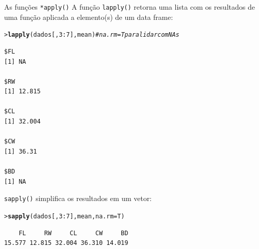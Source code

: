 \documentclass[10pt]{beamer}\usepackage[]{graphicx}\usepackage[]{color}
\makeatletter
\newcommand{\hlnum}[1]{\textcolor[rgb]{0.686,0.059,0.569}{#1}}%
\newcommand{\hlcom}[1]{\textcolor[rgb]{0.498,0.498,0.498}{\textit{#1}}}%
\newcommand{\hlopt}[1]{\textcolor[rgb]{0,0,0}{#1}}%
\newcommand{\hlstd}[1]{\textcolor[rgb]{0.345,0.345,0.345}{#1}}%
\newcommand{\hlkwc}[1]{\textcolor[rgb]{0.333,0.667,0.333}{#1}}%
\newcommand{\hlkwd}[1]{\textcolor[rgb]{0.282,0.239,0.545}{\textbf{#1}}}%
\newenvironment{kframe}{%
 \def\at@end@of@kframe{}%
 \ifinner\ifhmode%
  \def\at@end@of@kframe{\end{minipage}}%
  \begin{minipage}{\columnwidth}%
 \fi\fi%
 \def\FrameCommand##1{\hskip\@totalleftmargin \hskip-\fboxsep
 \colorbox{shadecolor}{##1}\hskip-\fboxsep
     \hskip-\linewidth \hskip-\@totalleftmargin \hskip\columnwidth}%
 \MakeFramed {\advance\hsize-\width
   \@totalleftmargin\z@ \linewidth\hsize
   \@setminipage}}%
 {\par\unskip\endMakeFramed%
 \at@end@of@kframe}
\newenvironment{knitrout}{}{} %
\makeatother
\begin{document}
\begin{frame}[fragile=singleslide]{As funções \texttt{*apply()}}
A função \texttt{lapply()} retorna uma lista com os resultados de uma
função aplicada a elemento(s) de um data frame:
\begin{knitrout}\small
{}\color{fgcolor}\begin{kframe}
\begin{alltt}
\hlstd{> }\hlkwd{lapply}\hlstd{(dados[,} \hlnum{3}\hlopt{:}\hlnum{7}\hlstd{], mean)} \hlcom{# na.rm = T para lidar com NAs}
\end{alltt}
\begin{verbatim}
$FL
[1] NA

$RW
[1] 12.815

$CL
[1] 32.004

$CW
[1] 36.31

$BD
[1] NA
\end{verbatim}
\end{kframe}
\end{knitrout}

\texttt{sapply()} simplifica os resultados em um vetor:
\begin{knitrout}\small
{}\color{fgcolor}\begin{kframe}
\begin{alltt}
\hlstd{> }\hlkwd{sapply}\hlstd{(dados[,} \hlnum{3}\hlopt{:}\hlnum{7}\hlstd{], mean,} \hlkwc{na.rm} \hlstd{= T)}
\end{alltt}
\begin{verbatim}
    FL     RW     CL     CW     BD 
15.577 12.815 32.004 36.310 14.019 
\end{verbatim}
\end{kframe}
\end{knitrout}

\end{frame}
\end{document}
